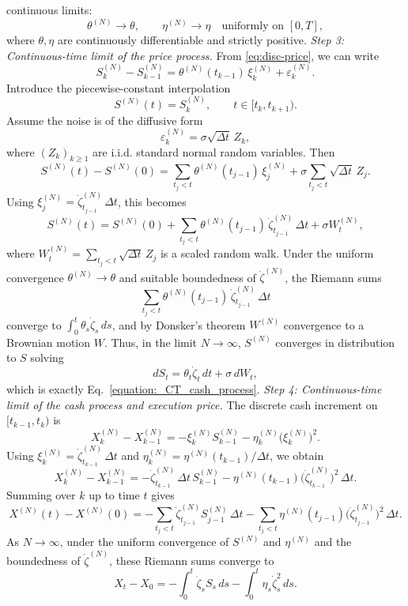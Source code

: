 \documentclass[final,3p,authoryear,12pt]{elsarticle}
\begin{document}
continuous limits:
\[
\theta^{(N)} \to \theta, 
\qquad
\eta^{(N)} \to \eta
\quad\text{uniformly on }[0,T],
\]
where $\theta,\eta$ are continuously differentiable and strictly positive.
\medskip\noindent
\textit{Step 3: Continuous-time limit of the price process.}
From \eqref{eq:disc-price}, we can write
\[
S^{(N)}_k - S^{(N)}_{k-1}
= \theta^{(N)}(t_{k-1})\,\xi^{(N)}_k + \varepsilon^{(N)}_k.
\]
Introduce the piecewise-constant interpolation
\[
S^{(N)}(t) = S^{(N)}_k, \qquad t\in[t_k,t_{k+1}).
\]
Assume the noise is of the diffusive form
\[
\varepsilon^{(N)}_k = \sigma \sqrt{\Delta t}\,Z_k,
\]
where $(Z_k)_{k\ge 1}$ are i.i.d. standard normal random variables.
Then
\[
S^{(N)}(t) - S^{(N)}(0)
= \sum_{t_{j}<t}
   \theta^{(N)}(t_{j-1})\,\xi^{(N)}_j
 + \sigma\sum_{t_{j}<t}\sqrt{\Delta t}\,Z_j.
\]
Using $\xi^{(N)}_j = \dot\zeta^{(N)}_{t_{j-1}}\,\Delta t$, this becomes
\[
S^{(N)}(t)
= S^{(N)}(0)
 + \sum_{t_{j}<t}
   \theta^{(N)}(t_{j-1})\,\dot\zeta^{(N)}_{t_{j-1}}\,\Delta t
 + \sigma W^{(N)}_t,
\]
where $W^{(N)}_t = \sum_{t_{j}<t}\sqrt{\Delta t}\,Z_j$ is a scaled random walk.
Under the uniform convergence $\theta^{(N)}\to\theta$ and suitable boundedness
of $\dot\zeta^{(N)}$, the Riemann sums
\[
\sum_{t_{j}<t}
   \theta^{(N)}(t_{j-1})\,\dot\zeta^{(N)}_{t_{j-1}}\,\Delta t
\]
converge to $\int_0^t \theta_s \dot\zeta_s\,ds$, and by Donsker’s theorem
$W^{(N)}$ convergence to a Brownian motion $W$. Thus, in the limit $N\to\infty$,
$S^{(N)}$ converges in distribution to $S$ solving
\[
dS_t = \theta_t \dot\zeta_t\,dt + \sigma\,dW_t,
\]
which is exactly Eq.~\eqref{equation:_CT_cash_process}.
\medskip\noindent
\textit{Step 4: Continuous-time limit of the cash process and execution price.}
The discrete cash increment on $[t_{k-1},t_k)$ is
\[
X^{(N)}_k - X^{(N)}_{k-1}
= -\xi^{(N)}_k S^{(N)}_{k-1}
  - \eta^{(N)}_k \big(\xi^{(N)}_k\big)^2.
\]
Using $\xi^{(N)}_k = \dot\zeta^{(N)}_{t_{k-1}}\,\Delta t$ and
$\eta^{(N)}_k = \eta^{(N)}(t_{k-1})/\Delta t$, we obtain
\[
X^{(N)}_k - X^{(N)}_{k-1}
= -\dot\zeta^{(N)}_{t_{k-1}}\,\Delta t\, S^{(N)}_{k-1}
  - \eta^{(N)}(t_{k-1})
    \big(\dot\zeta^{(N)}_{t_{k-1}}\big)^2\,\Delta t.
\]
Summing over $k$ up to time $t$ gives
\[
X^{(N)}(t) - X^{(N)}(0)
= -\sum_{t_{j}<t} \dot\zeta^{(N)}_{t_{j-1}} S^{(N)}_{j-1}\,\Delta t
  -\sum_{t_{j}<t} \eta^{(N)}(t_{j-1})
       \big(\dot\zeta^{(N)}_{t_{j-1}}\big)^2\,\Delta t.
\]
As $N\to\infty$, under the uniform convergence of $S^{(N)}$ and $\eta^{(N)}$
and the boundedness of $\dot\zeta^{(N)}$, these Riemann sums converge to
\[
X_t - X_0
= -\int_0^t \dot\zeta_s S_s\,ds
  -\int_0^t \eta_s \dot\zeta_s^2\,ds.
\]
\end{document}
